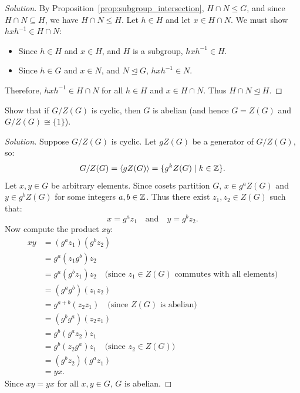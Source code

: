 \begin{proof}[Solution]
By Proposition~\ref{prop:subgroup_intersection}, $H \cap N \le G$, and since $H \cap N \subseteq H$, we have $H \cap N \le H$.
Let $h \in H$ and let $x \in H \cap N$.
We must show $hxh^{-1} \in H \cap N$:
\begin{itemize}[leftmargin=1.5em, itemsep=3pt]
    \item Since $h \in H$ and $x \in H$, and $H$ is a subgroup, $hxh^{-1} \in H$.
    \item Since $h \in G$ and $x \in N$, and $N \trianglelefteq G$, $hxh^{-1} \in N$.
\end{itemize}
Therefore, $hxh^{-1} \in H \cap N$ for all $h \in H$ and $x \in H \cap N$.
Thus $H \cap N \trianglelefteq H$.
\end{proof}

\begin{problem}
Show that if $G/Z(G)$ is cyclic, then $G$ is abelian (and hence $G = Z(G)$ and $G/Z(G) \cong \{1\}$).
\end{problem}

\begin{proof}[Solution]
Suppose $G/Z(G)$ is cyclic. Let $g Z(G)$ be a generator of $G/Z(G)$, so:
\begin{equation*}
G/Z(G) = \langle g Z(G) \rangle = \{ g^k Z(G) \mid k \in \mathbb{Z} \}.
\end{equation*}
Let $x, y \in G$ be arbitrary elements.
Since cosets partition $G$, $x \in g^a Z(G)$ and $y \in g^b Z(G)$ for some integers $a, b \in \mathbb{Z}$.
Thus there exist $z_1, z_2 \in Z(G)$ such that:
\begin{equation*}
x = g^a z_1 \quad \text{and} \quad y = g^b z_2.
\end{equation*}
Now compute the product $xy$:
\begin{align*}
xy &= (g^a z_1)(g^b z_2) \\
&= g^a (z_1 g^b) z_2 \\
&= g^a (g^b z_1) z_2 \quad \text{(since $z_1 \in Z(G)$ commutes with all elements)} \\
&= (g^a g^b)(z_1 z_2) \\
&= g^{a+b}(z_2 z_1) \quad \text{(since $Z(G)$ is abelian)} \\
&= (g^b g^a)(z_2 z_1) \\
&= g^b (g^a z_2) z_1 \\
&= g^b (z_2 g^a) z_1 \quad \text{(since $z_2 \in Z(G)$)} \\
&= (g^b z_2)(g^a z_1) \\
&= yx.
\end{align*}
Since $xy = yx$ for all $x, y \in G$, $G$ is abelian.
\end{proof}

